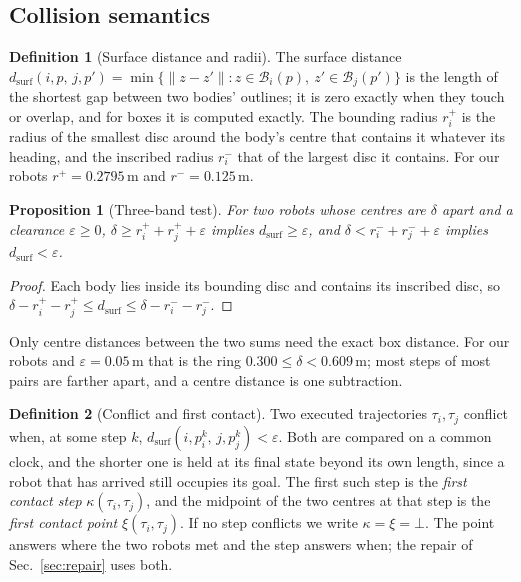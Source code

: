 \documentclass[conference]{IEEEtran}
\theoremstyle{plain}
\newtheorem{proposition}{Proposition}
\theoremstyle{definition}
\newtheorem{definition}{Definition}
\newcommand{\Bod}{\mathcal{B}}
\newcommand{\clr}{\varepsilon}
\begin{document}
\subsection{Collision semantics}
\label{sec:prelim-collision}

\begin{definition}[Surface distance and radii]
The surface distance
$d_{\text{surf}}(i,p,\,j,p') = \min\{\lVert z - z'\rVert : z \in \Bod_i(p),\ z' \in
\Bod_j(p')\}$ is the length of the shortest gap between two bodies' outlines; it is zero
exactly when they touch or overlap, and for boxes it is computed exactly. The bounding radius
$r^{+}_i$ is the radius of the smallest disc around the body's centre that contains it
whatever its heading, and the inscribed radius $r^{-}_i$ that of the largest disc it
contains. For our robots $r^{+} = 0.2795$\,m and $r^{-} = 0.125$\,m.
\end{definition}

\begin{proposition}[Three-band test]
\label{prop:bands}
For two robots whose centres are $\delta$ apart and a clearance $\clr \ge 0$,
$\delta \ge r^{+}_i + r^{+}_j + \clr$ implies $d_{\text{surf}} \ge \clr$, and
$\delta < r^{-}_i + r^{-}_j + \clr$ implies $d_{\text{surf}} < \clr$.
\end{proposition}

\begin{proof}
Each body lies inside its bounding disc and contains its inscribed disc, so
$\delta - r^{+}_i - r^{+}_j \le d_{\text{surf}} \le \delta - r^{-}_i - r^{-}_j$.
\end{proof}

Only centre distances between the two sums need the exact box distance. For our robots and
$\clr = 0.05$\,m that is the ring $0.300 \le \delta < 0.609$\,m; most steps of most pairs are
farther apart, and a centre distance is one subtraction.

\begin{definition}[Conflict and first contact]
\label{def:conflict}
Two executed trajectories $\tau_i,\tau_j$ conflict when, at some step $k$,
$d_{\text{surf}}(i,p_i^k,\,j,p_j^k) < \clr$. Both are compared on a common clock, and the
shorter one is held at its final state beyond its own length, since a robot that has arrived
still occupies its goal. The first such step is the \emph{first contact step}
$\kappa(\tau_i,\tau_j)$, and the midpoint of the two centres at that step is the \emph{first
contact point} $\xi(\tau_i,\tau_j)$. If no step conflicts we write $\kappa = \xi = \bot$. The
point answers where the two robots met and the step answers when; the repair of
Sec.~\ref{sec:repair} uses both.
\end{definition}
\end{document}
